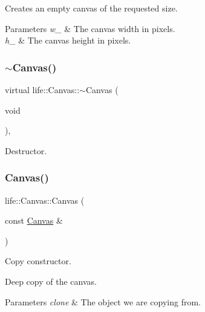 Creates an empty canvas of the requested size. 
\begin{DoxyParams}{Parameters}
{\em w\+\_\+} & The canvas width in pixels. \\
\hline
{\em h\+\_\+} & The canvas height in pixels. \\
\hline
\end{DoxyParams}
\mbox{\label{classlife_1_1_canvas_a39370c890281ecd237ab35af1afff372}} 
\subsubsection{\texorpdfstring{$\sim$Canvas()}{~Canvas()}}
{\footnotesize\ttfamily virtual life\+::\+Canvas\+::$\sim$\+Canvas (\begin{DoxyParamCaption}\item[{void}]{ }\end{DoxyParamCaption})\hspace{0.3cm}{\ttfamily [inline]}, {\ttfamily [virtual]}}



Destructor. 

\mbox{\label{classlife_1_1_canvas_a9abdcf7e5ad25469bf095eb7c7d067af}} 
\subsubsection{\texorpdfstring{Canvas()}{Canvas()}\hspace{0.1cm}{\footnotesize\ttfamily [2/3]}}
{\footnotesize\ttfamily life\+::\+Canvas\+::\+Canvas (\begin{DoxyParamCaption}\item[{const \mbox{\hyperlink{classlife_1_1_canvas}{Canvas}} \&}]{ }\end{DoxyParamCaption})}



Copy constructor. 

Deep copy of the canvas. 
\begin{DoxyParams}{Parameters}
{\em clone} & The object we are copying from. \\
\hline
\end{DoxyParams}
\mbox{\label{classlife_1_1_canvas_a1d7a3dff13b38fd9d8323919c1ca6e41}} 
